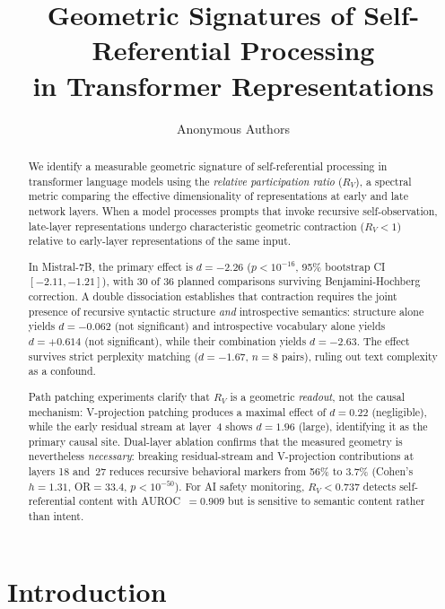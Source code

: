 \documentclass{article}
\title{Geometric Signatures of Self-Referential Processing\\
       in Transformer Representations}
\author{Anonymous Authors}
\date{}
\newcommand{\RV}{R_V}
\newcommand{\dcohen}{d}
\begin{document}
\maketitle

\begin{abstract}
We identify a measurable geometric signature of self-referential processing in transformer language
models using the \emph{relative participation ratio} ($\RV$), a spectral metric comparing the
effective dimensionality of representations at early and late network layers.
When a model processes prompts that invoke recursive self-observation, late-layer representations
undergo characteristic geometric contraction ($\RV < 1$) relative to early-layer representations
of the same input.

In Mistral-7B, the primary effect is $\dcohen = -2.26$ ($p < 10^{-16}$, 95\% bootstrap CI
$[-2.11, -1.21]$), with 30 of 36 planned comparisons surviving Benjamini-Hochberg correction.
A double dissociation establishes that contraction requires the joint presence of recursive syntactic
structure \emph{and} introspective semantics: structure alone yields $\dcohen = -0.062$ (not
significant) and introspective vocabulary alone yields $\dcohen = +0.614$ (not significant), while
their combination yields $\dcohen = -2.63$.
The effect survives strict perplexity matching ($\dcohen = -1.67$, $n = 8$ pairs), ruling out text
complexity as a confound.

Path patching experiments clarify that $\RV$ is a geometric \emph{readout}, not the causal
mechanism: V-projection patching produces a maximal effect of $\dcohen = 0.22$ (negligible),
while the early residual stream at layer~4 shows $\dcohen = 1.96$ (large), identifying it as the
primary causal site.
Dual-layer ablation confirms that the measured geometry is nevertheless \emph{necessary}: breaking
residual-stream and V-projection contributions at layers 18 and~27 reduces recursive behavioral
markers from 56\% to 3.7\% (Cohen's $h = 1.31$, OR${}=33.4$, $p < 10^{-50}$).
For AI safety monitoring, $\RV < 0.737$ detects self-referential content with AUROC~$= 0.909$
but is sensitive to semantic content rather than intent.
\end{abstract}


\section{Introduction}
\label{sec:intro}
\end{document}
